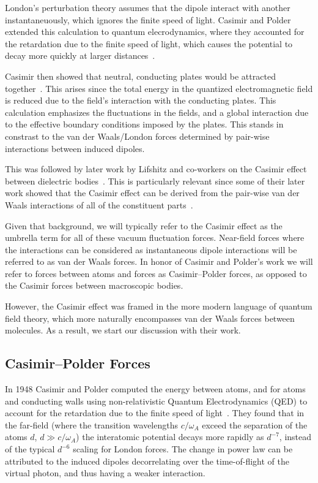 London's perturbation theory assumes that the dipole interact with another instantaneuously, which
ignores the finite speed of light.  Casimir and Polder extended this calculation to quantum elecrodynamics,
where they accounted for the retardation due to the finite speed of light, 
which causes the potential to decay more quickly at larger distances~\cite{CasimirPolder1948}.  

Casimir then showed that neutral, conducting plates would be attracted together~\cite{Casimir1948}.
This arises since the total energy in the quantized electromagnetic field is reduced due to the field's interaction
with the conducting plates.  This calculation emphasizes the fluctuations in the fields, and 
a global interaction due to the effective boundary conditions imposed by the plates.  This
stands in constrast to the van der Waals/London forces determined by pair-wise interactions between induced dipoles.

This was followed by later work by Lifshitz and co-workers on the Casimir effect between dielectric bodies~\cite{Lifshitz1956}.
This is particularly relevant since some of their later work showed that the Casimir effect can be derived 
from the pair-wise van der Waals interactions of all of the constituent parts~\cite{Dzyaloshinskii1961}.  

Given that background, we will typically refer to the Casimir effect as the umbrella term for all of these
vacuum fluctuation forces.  Near-field forces where the interactions can be considered as instantaneous
dipole interactions will be referred to as van der Waals forces.  In honor of Casimir and Polder's work
we will refer to forces between atoms and forces as Casimir--Polder forces, as opposed to the Casimir 
forces between macroscopic bodies.    

However, the Casimir effect was framed in the more modern language of quantum field theory, 
which more naturally encompasses van der Waals forces between molecules.  
As a result, we start our discussion with their work.  

\subsection{Casimir--Polder Forces}

In 1948 Casimir and Polder computed the energy between atoms, and for atoms and conducting walls 
using non-relativistic Quantum Electrodynamics (QED) to account for the retardation due to the finite speed of light~\cite{CasimirPolder1948}. 
They found that in the far-field 
(where the transition wavelengths $c/\omega_A$ exceed the separation of the atoms $d$, $d\gg c/\omega_A$)
the interatomic potential decays more rapidly as $d^{-7}$, instead of the typical $d^{-6}$ scaling for London forces.
 The change in power law can be 
attributed to the induced dipoles decorrelating over the time-of-flight of the virtual photon, 
and thus having a weaker interaction.
  
